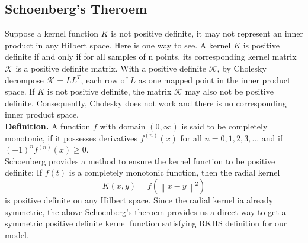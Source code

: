 \documentclass[12pt]{report} %
\newcommand{\norm}[1]{\left\lVert #1 \right\rVert}
\begin{document}
\subsection{Schoenberg's Theroem}
Suppose a kernel function $K$ is not positive definite, it may not represent an inner product in any Hilbert space. Here is one way to see. A kernel $K$ is positive definite if and only if for all samples of n points, its corresponding kernel matrix $\mathcal{K}$ is a positive definite matrix. With a positive definite $\mathcal{K}$, by Cholesky decompose $\mathcal{K}=LL^T$, each row of $L$ as one mapped point in the inner product space. If $K$ is not positive definite, the matrix $\mathcal{K}$ may also not be positive definite. Consequently, Cholesky does not work and there is no corresponding inner product space. \\
\textbf{Definition.} A function $f$ with domain $(0, \infty)$ is said to be completely monotonic, if it possesses derivatives $f^{(n)}(x)$ for all $n=0,1,2,3,...$ and if $(-1)^nf^{(n)}(x) \geq 0$\cite{CMF}. \\
Schoenberg\cite{Schoenberg} provides a method to ensure the kernel function to be positive definite: If \(f(t)\) is a completely monotonic function, then the radial kernel
\begin{equation}
K(x,y)=f(\norm{x-y}^2)
\end{equation}
is positive definite on any Hilbert space. Since the radial kernel ia already symmetric, the above Schoenberg's theroem provides us a direct way to get a symmetric positive definite kernel function satisfying RKHS definition for our model.
\end{document}
